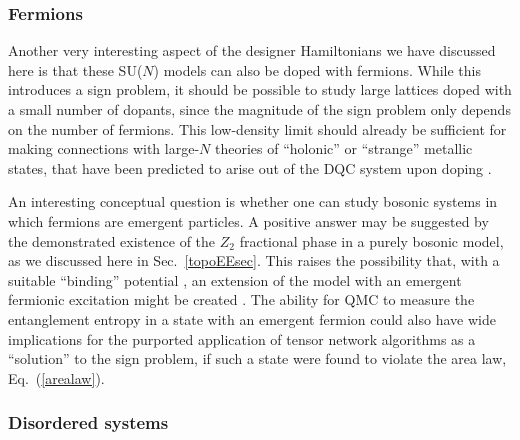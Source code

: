 \documentclass[range]{ar2e}
\begin{document}
\subsubsection{Fermions}

Another very interesting aspect of the designer Hamiltonians we have discussed here is that these SU($N$) models can also be doped with fermions. While this 
introduces a sign problem, it should be possible to study large lattices doped with a small number of dopants, since the magnitude of the 
sign problem only depends on the number of fermions. This low-density limit should already be sufficient for making connections with 
large-$N$ theories of ``holonic'' or ``strange'' metallic states, that have been predicted to arise out of the DQC system upon 
doping \cite{kaul2008:u1}.

An interesting conceptual question is whether one can study bosonic systems in which fermions are emergent particles.
A positive answer may be suggested by the demonstrated existence of the $Z_2$ fractional phase in a purely bosonic model, as we
discussed here in Sec.~\ref{topoEEsec}. This raises the possibility that, with a suitable ``binding'' potential \cite{FermionBind}, an extension of 
the model with an emergent fermionic excitation might be created \cite{Wenbook}.  
The ability for QMC to measure the entanglement entropy in a state with an emergent fermion
could also have wide implications for the purported application of tensor network algorithms as a ``solution'' to the sign problem, 
if such a state were found to violate the area law, Eq.~(\ref{arealaw}). 

\subsubsection{Disordered systems}
\end{document}
